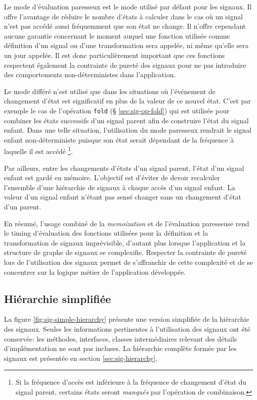 Le mode d'évaluation paresseux est le mode utilisé par défaut pour les signaux. Il offre l'avantage de réduire le nombre d'états à calculer dans le cas où un signal n'est pas accédé aussi fréquemment que son état ne change. Il n'offre cependant aucune garantie concernant le moment auquel une fonction utilisée comme définition d'un signal ou d'une transformation sera appelée, ni même qu'elle sera un jour appelée. Il est donc particulièrement important que ces fonctions respectent également la contrainte de pureté des signaux pour ne pas introduire des comportements non-déterministes dans l'application.

Le mode différé n'est utilisé que dans les situations où l'événement de changement d'état est significatif en plus de la valeur de ce nouvel état. C'est par exemple le cas de l'opération \texttt{fold} (§ \ref{sec:sig-op-fold}) qui est utilisée pour combiner les états successifs d'un signal parent afin de construire l'état du signal enfant. Dans une telle situation, l'utilisation du mode paresseux rendrait le signal enfant non-déterministe puisque son état serait dépendant de la fréquence à laquelle il est accédé \footnote{Si la fréquence d'accès est inférieure à la fréquence de changement d'état du signal parent, certains états seront \emph{manqués} par l'opération de combinaison.}.

Par ailleurs, entre les changements d'états d'un signal parent, l'état d'un signal enfant est gardé en mémoire. L'objectif est d'éviter de devoir recalculer l'ensemble d'une hiérarchie de signaux à chaque accès d'un signal enfant. La valeur d'un signal enfant n'étant pas sensé changer sans un changement d'état d'un parent.

En résumé, l'usage combiné de la \emph{memoization} et de l'évaluation paresseuse rend le timing d'évaluation des fonctions utilisées pour la définition et la transformation de signaux imprévisible, d'autant plus lorsque l'application et la structure de graphe de signaux se complexifie. Respecter la contrainte de pureté lors de l'utilisation des signaux permet de s'affranchir de cette complexité et de se concentrer sur la logique métier de l'application développée.

\subsection{Hiérarchie simplifiée}
La figure \ref{fig:sig-simple-hierarchy} présente une version simplifiée de la hiérarchie des signaux. Seules les informations pertinentes à l'utilisation des signaux ont été conservée: les méthodes, interfaces, classes intermédiaires relevant des détails d'implémentation ne sont pas incluses. La hiérarchie complète formée par les signaux est présentée en section \ref{sec:sig-hierarchy}.

